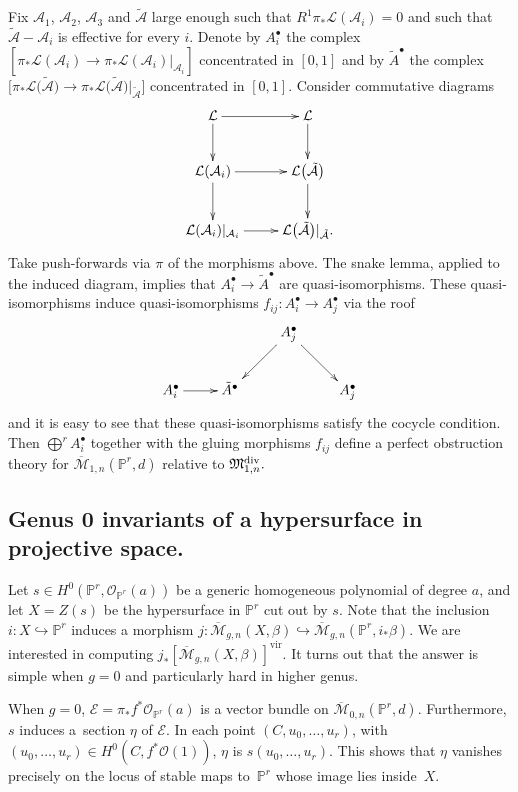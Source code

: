 \documentclass[pdftex]{sigma}
\numberwithin{equation}{section}
\newcommand{\PP}{\mathbb P}
\newcommand{\MM}[4]{\overline{\mathcal M}_{#1,#2}(#3,#4)}
\begin{document}
Fix $\mathcal{A}_1$, $\mathcal{A}_2$, $\mathcal{A}_3$ and $\tilde{\mathcal{A}}$ large enough such that $R^1\pi_*\mathcal{L}(\mathcal{A}_i)=0$ and such that $\tilde{\mathcal{A}}-\mathcal{A}_i$ is effective for every $i$. Denote by $A_i^{\bullet}$ the complex $[\pi_*\mathcal{L}(\mathcal{A}_i)\to \pi_*\mathcal{L}(\mathcal{A}_i)|_{\mathcal{A}_i}]$ concentrated in $[0,1]$ and by $\tilde{A}^{\bullet}$ the complex $\big[\pi_*\mathcal{L}\big(\tilde{\mathcal{A}}\big)\to \pi_*\mathcal{L}\big(\tilde{\mathcal{A}}\big)|_{\tilde{\mathcal{A}}}\big]$ concentrated in $[0,1]$. Consider commutative diagrams
\[\xymatrix{\mathcal{L}\ar[r]\ar[d]&\mathcal{L}\ar[d]\\
\mathcal{L}(\mathcal{A}_i)\ar[r]\ar[d]&\mathcal{L}\big(\tilde{\mathcal{A}}\big)\ar[d]\\
\mathcal{L}(\mathcal{A}_i)|_{\mathcal{A}_i}\ar[r]&\mathcal{L}\big(\tilde{\mathcal{A}}\big)|_{\tilde{\mathcal{A}}}.
}
\]
Take push-forwards via $\pi$ of the morphisms above. The snake lemma, applied to the induced diagram, implies that $A_i^{\bullet}\to \tilde{A}^{\bullet}$ are quasi-isomorphisms. These quasi-isomorphisms induce quasi-isomorphisms $f_{ij}\colon A_i^{\bullet}\to A_j^{\bullet}$ via the roof
\[ \xymatrix{
&&A_j^{\bullet}\ar[ld]\ar[rd]\\
A_i^{\bullet}\ar[r]&\tilde{A}^{\bullet}&&A_j^{\bullet}
}
\]
and it is easy to see that these quasi-isomorphisms satisfy the cocycle condition. Then $\bigoplus^r A_i^{\bullet}$ together with the gluing morphisms $f_{ij}$ define a perfect obstruction theory for $\MM{1}{n}{\mathbb P^r}{d}$ relative to $\mathfrak{M}^{\rm div}_{1,n}.$


\subsection{Genus 0 invariants of a hypersurface in projective space.}

Let $s\in H^0(\mathbb P^r,\mathcal O_{\mathbb P^r}(a))$ be a generic homogeneous polynomial of degree $a$, and let $X=Z(s)$ be the hypersurface in $\PP^r$ cut out by $s$. Note that the inclusion $i\colon X\hookrightarrow\mathbb P^r$ induces a morphism $j\colon \MM{g}{n}{X}{\beta}\hookrightarrow \MM{g}{n}{\mathbb P^r}{i_*\beta}$. We are interested in computing $j_*[\MM{g}{n}{X}{\beta}]^\text{vir}$. It turns out that the answer is simple when $g=0$ and particularly hard in higher genus.

When $g=0$, $\mathcal{E}=\pi_*f^*\mathcal O_{\mathbb P^r}(a)$ is a vector bundle on $\MM{0}{n}{\mathbb P^r}{d}$. Furthermore, $s$ induces a~section $\eta$ of $\mathcal{E}$. In each point $(C,u_0,\ldots,u_r)$, with $(u_0,\ldots,u_r)\in H^0( C,f^*\mathcal O(1))$, $\eta$ is $s(u_0,\ldots,u_r)$. This shows that $\eta$ vanishes precisely on the locus of stable maps to~$\mathbb P^r$ whose image lies inside~$X$.
\end{document}

